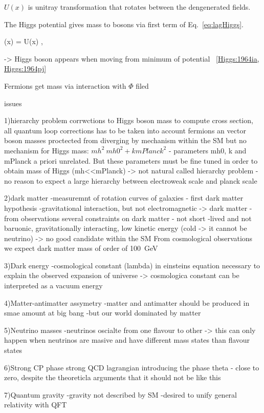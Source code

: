 $U(x)$ is unitray transformation that rotates between the dengenerated fields.

The Higgs potential gives mass to bosons via first term of Eq.~\ref{eq:lagHiggs}.

{
    \Phi(x) = U(x) ,
}

-> Higgs boson appears when moving from minimum of potential ~\ref{Higgs:1964ia, Higgs:1964pj}

Fermions get mass via interaction with $\Phi$ filed~\cite{Weinberg:1967tq}


issues

1)hierarchy problem
corrwctions to Higgs boson mass
to compute cross section, all quantum loop corrections has to be taken into account
fermions an vector boson masses proctected from diverging by mechanism within the SM
but no mechanism for Higgs mass: $mh^2~ mh0^2+k mPlanck^2 $ - parameters mh0, k and mPlanck a priori unrelated. But these parameters must be fine tuned in order to obtain mass of Higgs (mh<<mPlanck) -> not natural
called hierarchy problem - no reason to expect a large hierarchy between electroweak scale and planck scale

2)dark matter
-measuremnt of rotation curves of galaxies - first dark matter hypothesis
-gravitational interaction, but not electromagnetic -> dark matter
-from observations several constraints on dark matter - not short -lived and not baruonic, gravitationally interacting, low kinetic energy (cold -> it cannot be neutrino)
-> no good candidate within the SM
From cosmological observations we expect dark matter mass of order of 100~GeV

3)Dark energy
-cosmological constant (lambda) in einsteins equation necessary to explain the observed expansion of universe
-> cosmologica constant can be interpreted as a vacuum energy

4)Matter-antimatter assymetry
-matter and antimatter should be produced in smae amount at big bang
-but our world dominated by matter

5)Neutrino masses
-neutrinos oscialte from one flavour to other -> this can only happen when neutrinos are masive and have different mass states than flavour states

6)Strong CP phase
strong QCD lagrangian introducing the phase theta - close to zero, despite the theoreticla arguments that it should not be like this

7)Quantum gravity
-gravity not described by SM
-desired to unify general relativity with QFT

